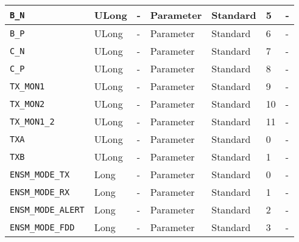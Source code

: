 \documentclass{article}
\begin{document}
\begin{landscape}
\begin{scriptsize}
\begin{longtable}{|p{3.6cm}|p{8.1cm}|p{1.4cm}|p{1.3cm}|p{1.4cm}|p{2.5cm}|p{3.6cm}|}
			\hline
      \verb+B_N+                       & ULong        & -               & Parameter             & Standard                         & 5                   & - \\
			\hline
      \verb+B_P+                       & ULong        & -               & Parameter             & Standard                         & 6                   & - \\
			\hline
      \verb+C_N+                       & ULong        & -               & Parameter             & Standard                         & 7                   & - \\
			\hline
      \verb+C_P+                       & ULong        & -               & Parameter             & Standard                         & 8                   & - \\
			\hline
      \verb+TX_MON1+                   & ULong        & -               & Parameter             & Standard                         & 9                   & - \\
			\hline
      \verb+TX_MON2+                   & ULong        & -               & Parameter             & Standard                         & 10                  & - \\
			\hline
      \verb+TX_MON1_2+                 & ULong        & -               & Parameter             & Standard                         & 11                  & - \\
			\hline
      \verb+TXA+                       & ULong        & -               & Parameter             & Standard                         & 0                   & - \\
			\hline
      \verb+TXB+                       & ULong        & -               & Parameter             & Standard                         & 1                   & - \\
			\hline
      \verb+ENSM_MODE_TX+              & Long         & -               & Parameter             & Standard                         & 0                   & - \\
			\hline
      \verb+ENSM_MODE_RX+              & Long         & -               & Parameter             & Standard                         & 1                   & - \\
			\hline
      \verb+ENSM_MODE_ALERT+           & Long         & -               & Parameter             & Standard                         & 2                   & - \\
			\hline
      \verb+ENSM_MODE_FDD+             & Long         & -               & Parameter             & Standard                         & 3                   & - \\

\end{longtable}
\end{scriptsize}
\end{landscape}
\end{document}
